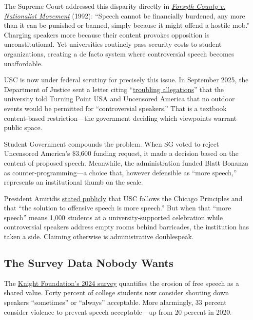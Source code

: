 \documentclass[11pt]{article}
\begin{document}
The Supreme Court addressed this disparity directly in \href{https://supreme.justia.com/cases/federal/us/505/123/}{\textit{Forsyth County v. Nationalist Movement}} (1992): ``Speech cannot be financially burdened, any more than it can be punished or banned, simply because it might offend a hostile mob.'' Charging speakers more because their content provokes opposition is unconstitutional. Yet universities routinely pass security costs to student organizations, creating a de facto system where controversial speech becomes unaffordable.

USC is now under federal scrutiny for precisely this issue. In September 2025, the Department of Justice sent a letter citing ``\href{https://www.postandcourier.com/education-lab/usc-doj-charlie-kirk-outdoor-event-controversial/article_c1d6ca0b-1173-403d-bd16-6f8fec66f748.html}{troubling allegations}'' that the university told Turning Point USA and Uncensored America that no outdoor events would be permitted for ``controversial speakers.'' That is a textbook content-based restriction---the government deciding which viewpoints warrant public space.

Student Government compounds the problem. When SG voted to reject Uncensored America's \$3,600 funding request, it made a decision based on the content of proposed speech. Meanwhile, the administration funded Blatt Bonanza as counter-programming---a choice that, however defensible as ``more speech,'' represents an institutional thumb on the scale.

President Amiridis \href{https://sc.edu/about/our_leadership/president/presidential-communications/2024-08-27_statement_about_campus_speakers.php}{stated publicly} that USC follows the Chicago Principles and that ``the solution to offensive speech is more speech.'' But when that ``more speech'' means 1,000 students at a university-supported celebration while controversial speakers address empty rooms behind barricades, the institution has taken a side. Claiming otherwise is administrative doublespeak.

\subsection{The Survey Data Nobody Wants}

The \href{https://knightfoundation.org/reports/college-student-views-on-free-expression-and-campus-speech-2024/}{Knight Foundation's 2024 survey} quantifies the erosion of free speech as a shared value. Forty percent of college students now consider shouting down speakers ``sometimes'' or ``always'' acceptable. More alarmingly, 33 percent consider violence to prevent speech acceptable---up from 20 percent in 2020.
\end{document}
